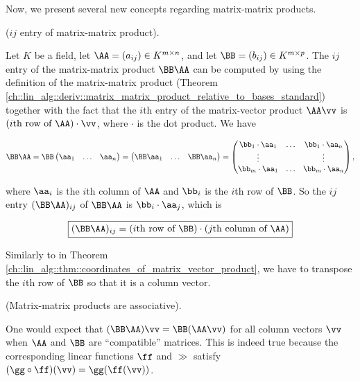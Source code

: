Now, we present several new concepts regarding matrix-matrix products.

\begin{theorem}
\label{ch::lin_alg::thm::coordinates_of_matrix_matrix_product}

    ($ij$ entry of matrix-matrix product). 
    
    Let $K$ be a field, let $\AA = (a_{ij}) \in K^{m \times n}$, and let $\BB = (b_{ij}) \in K^{m \times p}$. The $ij$ entry of the matrix-matrix product $\BB \AA$ can be computed by using the definition of the matrix-matrix product (Theorem \ref{ch::lin_alg::deriv::matrix_matrix_product_relative_to_bases_standard}) together with the fact that the $i$th entry of the matrix-vector product $\AA \vv$ is $(\text{$i$th row of $\AA$}) \cdot \vv$, where $\cdot$ is the dot product. We have
    
    \begin{align*}
        \BB \AA
        = 
        \BB
        \begin{pmatrix}
            \aa_1 & \hdots & \aa_n
        \end{pmatrix}
        =
        \begin{pmatrix}
            \BB \aa_1 & \hdots & \BB \aa_n
        \end{pmatrix}
        =
        \begin{pmatrix}
            \bb_1 \cdot \aa_1 & \hdots & \bb_1 \cdot \aa_n \\
            \vdots & & \vdots \\
            \bb_m \cdot \aa_1 & \hdots & \bb_m \cdot \aa_n
        \end{pmatrix},
    \end{align*}
    
    where $\aa_i$ is the $i$th column of $\AA$ and $\bb_i$ is the $i$th row of $\BB$. So the $ij$ entry $(\BB \AA)_{ij}$ of $\BB \AA$ is $\bb_i \cdot \aa_j$, which is
    
    \begin{align*}
        \boxed
        {
            (\BB \AA)_{ij} = (\text{$i$th row of $\BB$}) \cdot (\text{$j$th column of $\AA$})
        }
    \end{align*}
    
    Similarly to in Theorem \ref{ch::lin_alg::thm::coordinates_of_matrix_vector_product}, we have to transpose the $i$th row of $\BB$ so that it is a column vector.
\end{theorem}

\begin{remark}
    (Matrix-matrix products are associative).
    
    One would expect that $(\BB \AA) \vv = \BB (\AA \vv)$ for all column vectors $\vv$ when $\AA$ and $\BB$ are ``compatible'' matrices. This is indeed true because the corresponding linear functions $\ff$ and $\gg$ satisfy $(\gg \circ \ff)(\vv) = \gg(\ff(\vv))$.
\end{remark}

